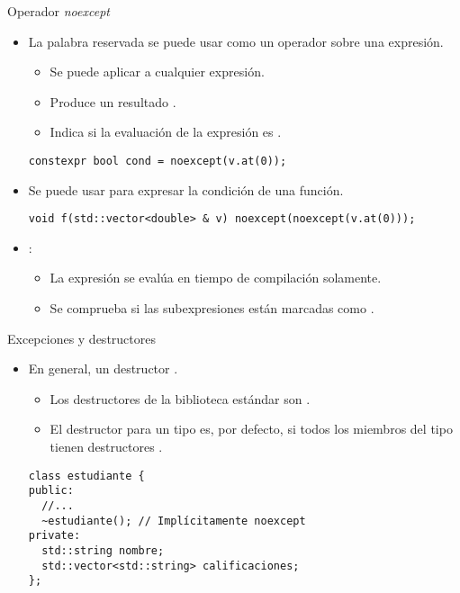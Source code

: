 \begin{frame}[t,fragile]{Operador \emph{noexcept}}
\begin{itemize}
  \item La palabra reservada  se puede usar como un operador
        sobre una expresión.
    \begin{itemize}
      \item Se puede aplicar a cualquier expresión.
      \item Produce un resultado .
      \item Indica si la evaluación de la expresión es .
    \end{itemize}
\begin{lstlisting}
constexpr bool cond = noexcept(v.at(0));
\end{lstlisting}

  \item Se puede usar para expresar la condición  de una función.
\begin{lstlisting}
void f(std::vector<double> & v) noexcept(noexcept(v.at(0)));
\end{lstlisting}

  \item {}:
    \begin{itemize}
      \item La expresión se evalúa en tiempo de compilación solamente.
      \item Se comprueba si las subexpresiones están marcadas como .
    \end{itemize}

\end{itemize}
\end{frame}

\begin{frame}[t,fragile]{Excepciones y destructores}
\begin{itemize}
  \item En general, un destructor .
    \begin{itemize}
      \item Los destructores de la biblioteca estándar son .
      \item El destructor para un tipo es, por defecto, 
            si todos los miembros del tipo tienen destructores .
    \end{itemize}

\begin{lstlisting}
class estudiante {
public:
  //...
  ~estudiante(); // Implícitamente noexcept
private:
  std::string nombre;
  std::vector<std::string> calificaciones;
};
\end{lstlisting}
\end{itemize}
\end{frame}
